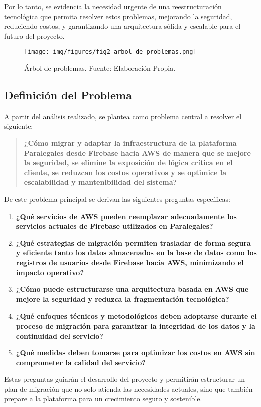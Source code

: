 Por lo tanto, se evidencia la necesidad urgente de una reestructuración tecnológica que permita resolver estos problemas, mejorando la seguridad, reduciendo costos, y garantizando una arquitectura sólida y escalable para el futuro del proyecto.

\begin{figure}[H]
  \centering
  \texttt{[image: img/figures/fig2-arbol-de-problemas.png]}
  \caption{Árbol de problemas. Fuente: Elaboración Propia.}
  \label{fig:arbol_problemas}
\end{figure}

\subsection{Definición del Problema}
A partir del análisis realizado, se plantea como problema central a resolver el siguiente:
\begin{quote}
  \textbf{¿Cómo migrar y adaptar la infraestructura de la plataforma Paralegales desde Firebase hacia AWS de manera que se mejore la seguridad, se elimine la exposición de lógica crítica en el cliente, se reduzcan los costos operativos y se optimice la escalabilidad y mantenibilidad del sistema?}
\end{quote}

De este problema principal se derivan las siguientes preguntas específicas:

\begin{enumerate}
  \item \textbf{¿Qué servicios de AWS pueden reemplazar adecuadamente los servicios actuales de Firebase utilizados en Paralegales?}
  \item \textbf{¿Qué estrategias de migración permiten trasladar de forma segura y eficiente tanto los datos almacenados en la base de datos como los registros de usuarios desde Firebase hacia AWS, minimizando el impacto operativo?}
  \item \textbf{¿Cómo puede estructurarse una arquitectura basada en AWS que mejore la seguridad y reduzca la fragmentación tecnológica?}
  \item \textbf{¿Qué enfoques técnicos y metodológicos deben adoptarse durante el proceso de migración para garantizar la integridad de los datos y la continuidad del servicio?}
  \item \textbf{¿Qué medidas deben tomarse para optimizar los costos en AWS sin comprometer la calidad del servicio?}
\end{enumerate}

Estas preguntas guiarán el desarrollo del proyecto y permitirán estructurar un plan de migración que no solo atienda las necesidades actuales, sino que también prepare a la plataforma para un crecimiento seguro y sostenible.

